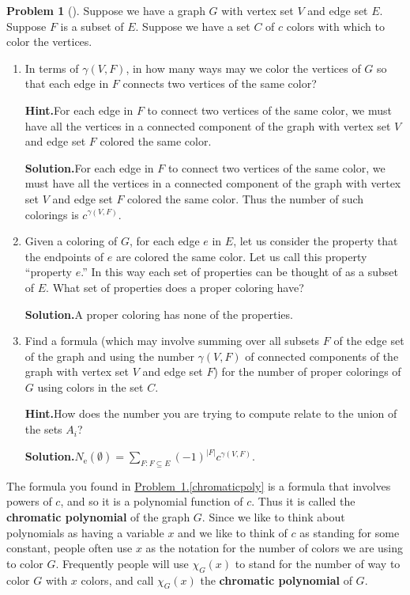 \documentclass[10pt,]{book}
\newcommand{\terminology}[1]{\textbf{#1}}
\theoremstyle{plain}
\theoremstyle{definition}
\newtheorem{activity}[project]{Problem}
\theoremstyle{definition}
\numberwithin{equation}{chapter}
\begin{document}
\begin{activity}[]\label{activity-242}
Suppose we have a graph \(G\) with vertex set \(V\) and edge set \(E\). Suppose \(F\) is a subset of \(E\). Suppose we have a set \(C\) of \(c\) colors with which to color the vertices.%
\begin{enumerate}[font=\bfseries,label=(\alph*),ref=\alph*]
\item\label{task-177} In terms of \(\gamma(V,F)\), in how many ways may we color the vertices of \(G\) so that each edge in \(F\) connects two vertices of the same color?%
\par\medskip\noindent%
\textbf{Hint.}\quad For each edge in \(F\) to connect two vertices of the same color, we must have all the vertices in a connected component of the graph  with vertex set \(V\) and edge set \(F\) colored the same color.%
\par\medskip\noindent%
\textbf{Solution.}\quad For each edge in \(F\) to connect two vertices of the same color, we must have all the vertices in a connected component of the graph with vertex set \(V\) and edge set \(F\) colored the same color. Thus the number of such colorings is \(c^{\gamma(V,F)}\).%
\item\label{task-178} Given a coloring of \(G\), for each edge \(e\) in \(E\), let us consider the property that the endpoints of \(e\) are colored the same color.  Let us call this property ``property \(e\).''  In this way each set of properties can be thought of as a subset of \(E\).  What set of properties does a proper coloring have?%
\par\medskip\noindent%
\textbf{Solution.}\quad A proper coloring has none of the properties.%
\item\label{chromaticpoly} Find a formula (which may involve summing over all subsets \(F\) of the edge set of the graph and using the number \(\gamma(V,F)\) of connected components of the graph with vertex set \(V\) and edge set \(F\)) for the number of proper colorings of \(G\) using colors in the set \(C\).%
\par\medskip\noindent%
\textbf{Hint.}\quad How does the number you are trying to compute relate to the union of the sets \(A_i\)?%
\par\medskip\noindent%
\textbf{Solution.}\quad \(N_{\mbox{e} }(\emptyset)=\sum_{F:F\subseteq E}
(-1)^{|F|}c^{\gamma(V,F)}.\)%
\end{enumerate}
\end{activity}
The formula you found in \hyperref[chromaticpoly]{Problem~\ref{activity-242}.\ref{chromaticpoly}} is a formula that involves powers of \(c\), and so it is a polynomial function of \(c\). Thus it is called the \terminology{chromatic polynomial} of the graph \(G\). Since we like to think about polynomials as having a variable \(x\) and we like to think of \(c\) as standing for some constant, people often use \(x\) as the notation for the number of colors we are using to color \(G\). Frequently people will use \(\chi_G(x)\) to stand for the number of way to color \(G\) with \(x\) colors, and call \(\chi_G(x)\) the \terminology{chromatic polynomial} of \(G\).%
\end{document}
